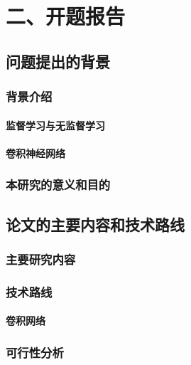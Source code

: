 \chapter{二、开题报告}

\section{问题提出的背景}

\subsection{背景介绍}

\subsubsection{监督学习与无监督学习}



\subsubsection{卷积神经网络}



\subsection{本研究的意义和目的}



\section{论文的主要内容和技术路线}


\subsection{主要研究内容}



\subsection{技术路线}

\subsubsection{卷积网络}


\subsection{可行性分析}


